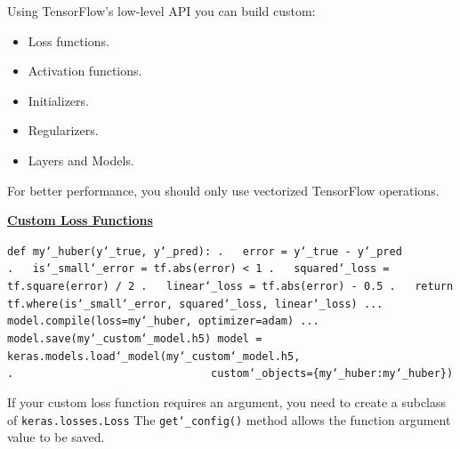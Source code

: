 Using TensorFlow's low-level API you can build custom:
% 
\vspace{-5.0mm}
\begin{itemize}
\item
Loss functions.
\vspace{-3.0mm}
\item
Activation functions.
\vspace{-3.0mm}
\item
Initializers.
\vspace{-3.0mm}
\item
Regularizers.
\vspace{-3.0mm}
\item
Layers and Models.
\end{itemize}

\newpage
For better performance,
you should only use vectorized TensorFlow operations.\newline

\textbf{\underline{Custom Loss Functions}}

\texttt{def my\char`_huber(y\char`_true, y\char`_pred):\newline
.~~~error = y\char`_true - y\char`_pred\newline
.~~~is\char`_small\char`_error = tf.abs(error) < 1\newline
.~~~squared\char`_loss = tf.square(error) / 2\newline
.~~~linear\char`_loss = tf.abs(error) - 0.5\newline
.~~~return tf.where(is\char`_small\char`_error, squared\char`_loss, linear\char`_loss)\newline
...\newline
model.compile(loss=my\char`_huber, optimizer=\textquotesingle adam\textquotesingle)\newline
...\newline
model.save(\textquotesingle my\char`_custom\char`_model.h5\textquotesingle)\newline
model = keras.models.load\char`_model(\textquotesingle my\char`_custom\char`_model.h5\textquotesingle,\newline
.~~~~~~~~~~~~~~~~~~~~~~~~~~~~~~~custom\char`_objects=\{\textquotesingle my\char`_huber\textquotesingle:my\char`_huber\})}\newline

If your custom loss function requires an argument,
you need to create a subclass of \texttt{keras.losses.Loss}
The \texttt{get\char`_config()} method allows the function argument value to be saved.


